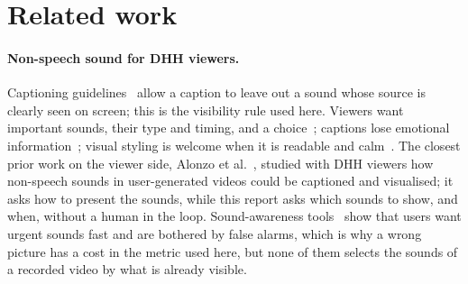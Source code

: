 \section{Related work}\label{sec:related}

\paragraph{Non-speech sound for DHH viewers.} Captioning guidelines~\cite{dcmp} allow a caption to leave out a sound whose source is
clearly seen on screen; this is the visibility rule used here. Viewers want important sounds, their type and timing,
and a choice~\cite{may2025choices,alonzo2022beyond}; captions lose emotional information~\cite{revuelta2020eeg};
visual styling is welcome when it is readable and calm~\cite{delacerdapataca2024royale,prosodycaptions}. The closest
prior work on the viewer side, Alonzo et al.~\cite{alonzo2022beyond}, studied with DHH viewers how non-speech sounds in user-generated
videos could be captioned and visualised; it asks how to present the sounds, while this report asks which sounds to
show, and when, without a human in the loop. Sound-awareness
tools~\cite{jain2015hmd,jain2019home,homesound,soundwatch,protosound} show that users want urgent sounds fast and are bothered by
false alarms, which is why a wrong picture has a cost in the metric used here, but none of them selects the sounds of a
recorded video by what is already visible.

